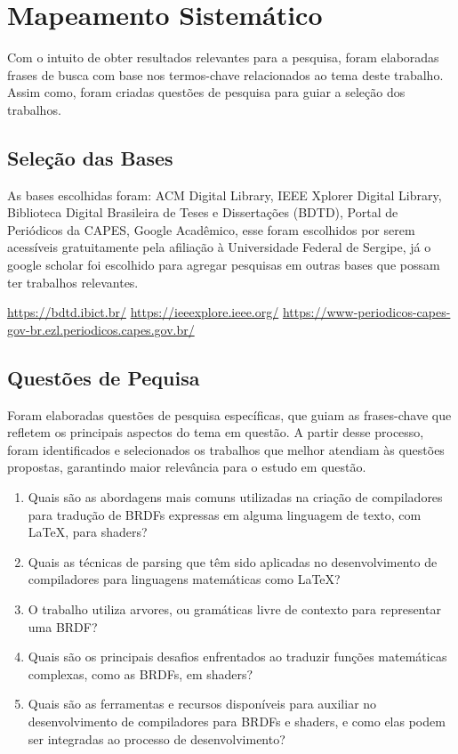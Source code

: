 \documentclass[english, 
               brazil, 
               bsc] %
               {dcomp-abntex2}
\begin{document}
\section{Mapeamento Sistemático}

Com o intuito de obter resultados relevantes para a pesquisa, foram elaboradas frases de busca com base nos termos-chave relacionados ao tema deste trabalho. Assim como, foram criadas questões de pesquisa para guiar a seleção dos trabalhos.

\subsection{Seleção das Bases}
As bases escolhidas foram: ACM Digital Library,  IEEE Xplorer Digital Library,  Biblioteca Digital Brasileira de Teses e Dissertações (BDTD), Portal de Periódicos da CAPES,  Google Acadêmico, esse foram escolhidos por serem acessíveis gratuitamente pela afiliação à Universidade Federal de Sergipe, já o google scholar foi escolhido para agregar pesquisas em outras bases que possam ter trabalhos relevantes.

\url{https://bdtd.ibict.br/}
\url{https://ieeexplore.ieee.org/}
\url{https://www-periodicos-capes-gov-br.ezl.periodicos.capes.gov.br/}



\subsection{Questões de Pequisa} 

Foram elaboradas questões de pesquisa específicas, que guiam as frases-chave que refletem os principais aspectos do tema em questão. A partir desse processo, foram identificados e selecionados os trabalhos que melhor atendiam às questões propostas, garantindo maior relevância para o estudo em questão.

\begin{enumerate}
  \item Quais são as abordagens mais comuns utilizadas na criação de compiladores para tradução de BRDFs expressas em alguma linguagem de texto, com \LaTeX , para shaders?

  \item Quais as técnicas de parsing que têm sido aplicadas no desenvolvimento de compiladores para linguagens matemáticas como \LaTeX ?

  \item O trabalho utiliza arvores, ou gramáticas livre de contexto para representar uma BRDF?

 \item Quais são os principais desafios enfrentados ao traduzir funções matemáticas complexas, como as BRDFs, em shaders?

 \item Quais são as ferramentas e recursos disponíveis para auxiliar no desenvolvimento de compiladores para BRDFs e shaders, e como elas podem ser integradas ao processo de desenvolvimento?

\end{enumerate}
\end{document}
